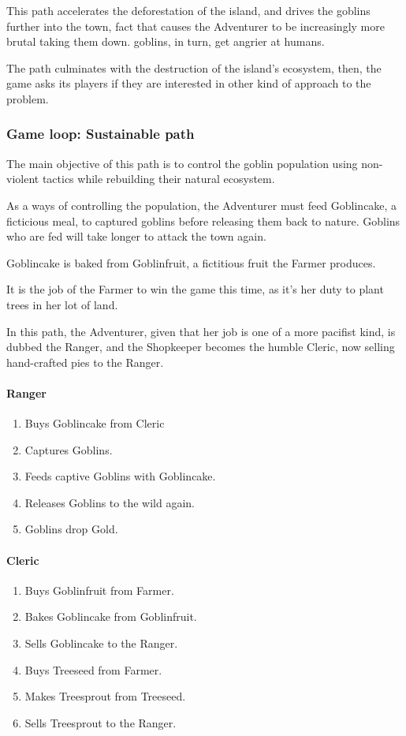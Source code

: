 This path accelerates the deforestation of the island, and drives the goblins
further into the town, fact that causes the Adventurer to be increasingly
more brutal taking them down. goblins, in turn, get angrier at humans.

The path culminates with the destruction of the island's ecosystem,
then, the game asks its players if they are interested in other kind of
approach to the problem.

\subsubsection{Game loop: Sustainable path}

The main objective of this path is to control the goblin population using
non-violent tactics while rebuilding their natural ecosystem.

As a ways of controlling the population, the Adventurer must feed
Goblincake, a ficticious meal, to captured goblins before
releasing them back to nature. Goblins who are fed will take longer to
attack the town again.

Goblincake is baked from Goblinfruit, a fictitious fruit the Farmer produces.

It is the job of the Farmer to win the game this time, as it's her duty
to plant trees in her lot of land.

In this path, the Adventurer, given that her job is one of a more pacifist
kind, is dubbed the Ranger, and the Shopkeeper becomes the humble Cleric,
now selling hand-crafted pies to the Ranger.

\paragraph{Ranger}
\begin{enumerate}
	\item Buys Goblincake from Cleric
	\item Captures Goblins.
	\item Feeds captive Goblins with Goblincake.
	\item Releases Goblins to the wild again.
	\item Goblins drop Gold.
\end{enumerate}

\paragraph{Cleric}
\begin{enumerate}
	\item Buys Goblinfruit from Farmer.
	\item Bakes Goblincake from Goblinfruit.
	\item Sells Goblincake to the Ranger.
	\item Buys Treeseed from Farmer.
	\item Makes Treesprout from Treeseed.
	\item Sells Treesprout to the Ranger.
\end{enumerate}

